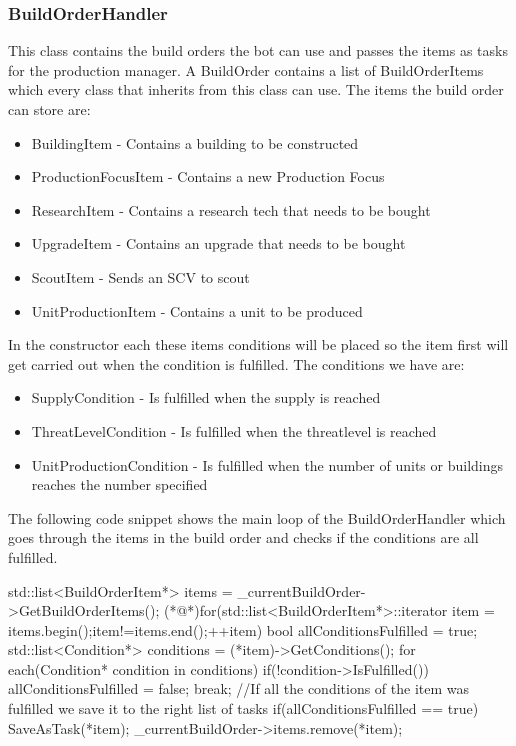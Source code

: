 		\subsubsection*{BuildOrderHandler}
			This class contains the build orders the bot can use and passes the items as tasks for the production manager. A BuildOrder contains a list of 
			BuildOrderItems which every class that inherits from this class can use. The items the build order can store are:
			\begin{itemize}
				\item BuildingItem - Contains a building to be constructed
				\item ProductionFocusItem - Contains a new Production Focus
				\item ResearchItem - Contains a research tech that needs to be bought
				\item UpgradeItem - Contains an upgrade that needs to be bought
				\item ScoutItem - Sends an SCV to scout
				\item UnitProductionItem - Contains a unit to be produced
			\end{itemize}
			In the constructor each these items conditions will be placed so the item first will get carried out when the condition is fulfilled.
			The conditions we have are: 
			\begin{itemize}
				\item SupplyCondition - Is fulfilled when the supply is reached
				\item ThreatLevelCondition - Is fulfilled when the threatlevel is reached
				\item UnitProductionCondition - Is fulfilled when the number of units or buildings reaches the number specified
			\end{itemize}
			The following code snippet shows the main loop of the BuildOrderHandler which goes through the items in the build order and checks if the 
			conditions are all fulfilled.
			\pagebreak
				\begin{Sourcecode}[caption=BuildOrderHandler main loop]
		std::list<BuildOrderItem*> items = _currentBuildOrder->GetBuildOrderItems();
		(*@\lnote@*)for(std::list<BuildOrderItem*>::iterator item = items.begin();item!=items.end();++item)
		{
			bool allConditionsFulfilled = true;
			std::list<Condition*> conditions = (*item)->GetConditions();
			for each(Condition* condition in conditions)
			{
				if(!condition->IsFulfilled())
				{
					allConditionsFulfilled = false;
					break;
				}
			}
			//If all the conditions of the item was fulfilled we save it to the right list of tasks
			if(allConditionsFulfilled == true)
			{
				SaveAsTask(*item);				
				_currentBuildOrder->items.remove(*item);
			}
		}	
				\end{Sourcecode}
